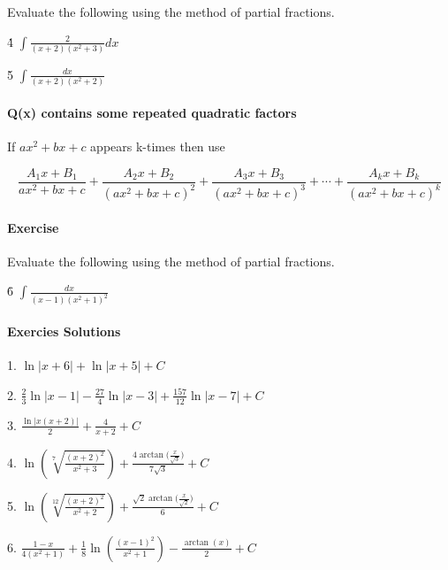 Evaluate the following using the method of partial fractions.



4\. $\int\frac{2}{(x+2)(x^2+3)}dx$



5\. $\int\frac{dx}{(x+2)(x^2+2)}$



\paragraph{Q(x) contains some repeated quadratic factors}



If $ax^2+bx+c$ appears k-times then use



$$\frac{A _1x+B _1}{ax^2+bx+c}+\frac{A _2x+B _2}{(ax^2+bx+c)^2}+\frac{A _3x+B _3}{(ax^2+bx+c)^3}+\cdots+\frac{A _kx+B _k}{(ax^2+bx+c)^k}$$



\paragraph{Exercise}



Evaluate the following using the method of partial fractions.



6\. $\int\frac{dx}{(x-1)(x^2+1)^2}$



\paragraph{Exercies Solutions}



1.  $\ln\Big|x+6\Big|+\ln\Big|x+5\Big|+C$

2.  $\tfrac{2}{3}\ln\Big|x-1\Big|-\tfrac{27}{4}\ln\Big|x-3\Big|+\tfrac{157}{12}\ln\Big|x-7\Big|+C$

3.  $\frac{\ln\Big|x(x+2)\Big|}{2}+\frac{4}{x+2}+C$

4.  $\ln\left(\sqrt[7]{\frac{(x+2)^2}{x^2+3}}\right)+\frac{4\arctan\Big(\tfrac{x}{\sqrt3}\Big)}{7\sqrt3}+C$

5.  $\ln\left(\sqrt[12]{\frac{(x+2)^2}{x^2+2}}\right)+\frac{\sqrt2\arctan\Big(\tfrac{x}{\sqrt2}\Big)}{6}+C$

6.  $\frac{1-x}{4(x^2+1)}+\tfrac{1}{8}\ln\left(\frac{(x-1)^2}{x^2+1}\right)-\frac{\arctan(x)}{2}+C$



